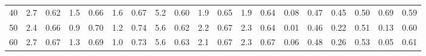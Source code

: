 \documentclass[10pt, letterpaper]{IEEEtran}
\begin{document}
\begin{CJK}{UTF8}{ipxm}
\begin{table*}[t]
\begin{center}
\begin{tabular}{c|cccccc|cccccc|cccccc}
      40 & 2.7 & \hspace{-0.25cm} 0.62 & \hspace{-0.25cm} 1.5 & \hspace{-0.25cm} 0.66 & \hspace{-0.25cm} 1.6 & \hspace{-0.25cm} 0.67 & 5.2 & \hspace{-0.25cm} 0.60 & \hspace{-0.25cm} 1.9 & \hspace{-0.25cm} 0.65 & \hspace{-0.25cm} 1.9 & \hspace{-0.25cm} 0.64 & 0.08 & \hspace{-0.25cm} 0.47 & \hspace{-0.25cm} 0.45 & \hspace{-0.25cm} 0.50 & \hspace{-0.25cm} 0.69 & \hspace{-0.25cm} 0.59 \\
      50 & 2.4 & \hspace{-0.25cm} 0.66 & \hspace{-0.25cm} 0.9 & \hspace{-0.25cm} 0.70 & \hspace{-0.25cm} 1.2 & \hspace{-0.25cm} 0.74 & 5.6 & \hspace{-0.25cm} 0.62 & \hspace{-0.25cm} 2.2 & \hspace{-0.25cm} 0.67 & \hspace{-0.25cm} 2.3 & \hspace{-0.25cm} 0.64 & 0.01 & \hspace{-0.25cm} 0.46 & \hspace{-0.25cm} 0.22 & \hspace{-0.25cm} 0.51 & \hspace{-0.25cm} 0.13 & \hspace{-0.25cm} 0.60 \\
      60 & 2.7 & \hspace{-0.25cm} 0.67 & \hspace{-0.25cm} 1.3 & \hspace{-0.25cm} 0.69 & \hspace{-0.25cm} 1.0 & \hspace{-0.25cm} 0.73 & 5.6 & \hspace{-0.25cm} 0.63 & \hspace{-0.25cm} 2.1 & \hspace{-0.25cm} 0.67 & \hspace{-0.25cm} 2.3 & \hspace{-0.25cm} 0.67 & 0.06 & \hspace{-0.25cm} 0.48 & \hspace{-0.25cm} 0.26 & \hspace{-0.25cm} 0.53 & \hspace{-0.25cm} 0.05 & \hspace{-0.25cm} 0.61 \\

\end{tabular}
\end{center}
\end{table*}
\end{CJK}
\end{document}
